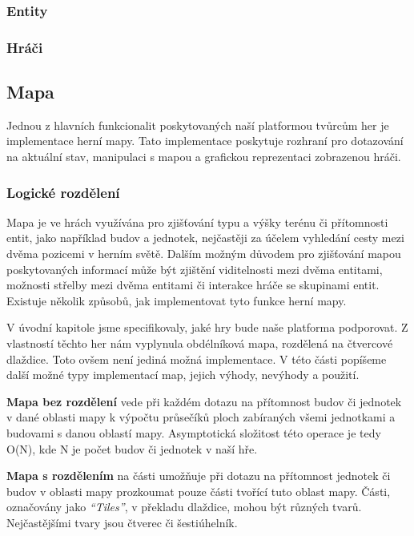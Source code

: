 \subsubsection{Entity}


\subsubsection{Hráči}


\subsection{Mapa}
\label{sec:mapimpl}
Jednou z hlavních funkcionalit poskytovaných naší platformou tvůrcům her je implementace herní mapy. Tato implementace poskytuje rozhraní pro dotazování na aktuální stav, manipulaci s mapou a grafickou reprezentaci zobrazenou hráči.

\subsubsection{Logické rozdělení}
\label{sec:maplogic}
Mapa je ve hrách využívána pro zjišťování typu a výšky terénu či přítomnosti entit, jako například budov a jednotek, nejčastěji za účelem vyhledání cesty mezi dvěma pozicemi v herním světě. Dalším možným důvodem pro zjišťování mapou poskytovaných informací může být zjištění viditelnosti mezi dvěma entitami, možnosti střelby mezi dvěma entitami či interakce hráče se skupinami entit.  Existuje několik způsobů, jak implementovat tyto funkce herní mapy.

V úvodní kapitole jsme specifikovaly, jaké hry bude naše platforma podporovat. Z vlastností těchto her nám vyplynula obdélníková mapa, rozdělená na čtvercové dlaždice. Toto ovšem není jediná možná implementace. V této části popíšeme další možné typy implementací map, jejich výhody, nevýhody a použití.

\textbf{Mapa bez rozdělení} vede při každém dotazu na přítomnost budov či jednotek v dané oblasti mapy k výpočtu průsečíků ploch zabíraných všemi jednotkami a budovami s danou oblastí mapy. Asymptotická složitost této operace je tedy O(N), kde N je počet budov či jednotek v naší hře.

\textbf{Mapa s rozdělením} na části umožňuje při dotazu na přítomnost jednotek či budov v oblasti mapy prozkoumat pouze části tvořící tuto oblast mapy. Části, označovány jako \textit{``Tiles''}, v překladu dlaždice, mohou být různých tvarů. Nejčastějšími tvary jsou čtverec či šestiúhelník. 


